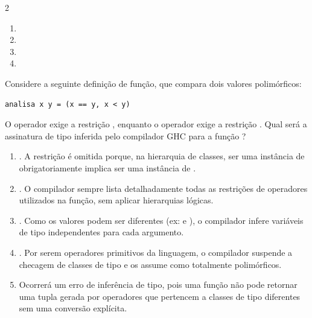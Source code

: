 \documentclass[a4paper,10pt,brazil]{article}
\begin{document}
\begin{multicols}{2}
\begin{enumerate}
  \item {}

  \item {}

  \item {}

  \item {}

\end{enumerate}

Considere a seguinte definição de função, que compara dois valores polimórficos:
\begin{verbatim}
analisa x y = (x == y, x < y)
\end{verbatim}
O operador \haskellinline{==} exige a restrição , enquanto o operador \haskellinline{<} exige a restrição . Qual será a assinatura de tipo inferida pelo compilador GHC para a função ?

\begin{enumerate}
  \item {}. A restrição  é omitida porque, na hierarquia de classes, ser uma instância de  obrigatoriamente implica ser uma instância de .

  \item {}. O compilador sempre lista detalhadamente todas as restrições de operadores utilizados na função, sem aplicar hierarquias lógicas.

  \item {}. Como os valores podem ser diferentes (ex:  e ), o compilador infere variáveis de tipo independentes para cada argumento.

  \item {}. Por serem operadores primitivos da linguagem, o compilador suspende a checagem de classes de tipo e os assume como totalmente polimórficos.

  \item Ocorrerá um erro de inferência de tipo, pois uma função não pode retornar uma tupla gerada por operadores que pertencem a classes de tipo diferentes sem uma conversão explícita.



\end{enumerate}
\end{multicols}
\end{document}
